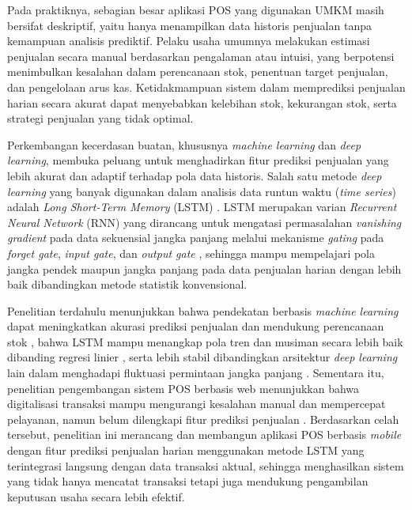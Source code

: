 \documentclass[a4paper,10pt,onecolumn]{article}
\begin{document}
Pada praktiknya, sebagian besar aplikasi POS yang digunakan UMKM masih bersifat deskriptif, yaitu hanya menampilkan data historis penjualan tanpa kemampuan analisis prediktif. Pelaku usaha umumnya melakukan estimasi penjualan secara manual berdasarkan pengalaman atau intuisi, yang berpotensi menimbulkan kesalahan dalam perencanaan stok, penentuan target penjualan, dan pengelolaan arus kas. Ketidakmampuan sistem dalam memprediksi penjualan harian secara akurat dapat menyebabkan kelebihan stok, kekurangan stok, serta strategi penjualan yang tidak optimal.

Perkembangan kecerdasan buatan, khususnya \textit{machine learning} dan \textit{deep learning}, membuka peluang untuk menghadirkan fitur prediksi penjualan yang lebih akurat dan adaptif terhadap pola data historis. Salah satu metode \textit{deep learning} yang banyak digunakan dalam analisis data runtun waktu (\textit{time series}) adalah \textit{Long Short-Term Memory} (LSTM) \cite{Hochreiter1997}. LSTM merupakan varian \textit{Recurrent Neural Network} (RNN) yang dirancang untuk mengatasi permasalahan \textit{vanishing gradient} pada data sekuensial jangka panjang melalui mekanisme \textit{gating} pada \textit{forget gate}, \textit{input gate}, dan \textit{output gate} \cite{Goodfellow2016}, sehingga mampu mempelajari pola jangka pendek maupun jangka panjang pada data penjualan harian dengan lebih baik dibandingkan metode statistik konvensional.

Penelitian terdahulu menunjukkan bahwa pendekatan berbasis \textit{machine learning} dapat meningkatkan akurasi prediksi penjualan dan mendukung perencanaan stok \cite{Darmanto2024}, bahwa LSTM mampu menangkap pola tren dan musiman secara lebih baik dibanding regresi linier \cite{Prasetyo2023}, serta lebih stabil dibandingkan arsitektur \textit{deep learning} lain dalam menghadapi fluktuasi permintaan jangka panjang \cite{Ramadhan2022}. Sementara itu, penelitian pengembangan sistem POS berbasis web menunjukkan bahwa digitalisasi transaksi mampu mengurangi kesalahan manual dan mempercepat pelayanan, namun belum dilengkapi fitur prediksi penjualan \cite{Wijaya2022}. Berdasarkan celah tersebut, penelitian ini merancang dan membangun aplikasi POS berbasis \textit{mobile} dengan fitur prediksi penjualan harian menggunakan metode LSTM yang terintegrasi langsung dengan data transaksi aktual, sehingga menghasilkan sistem yang tidak hanya mencatat transaksi tetapi juga mendukung pengambilan keputusan usaha secara lebih efektif.

\end{document}
